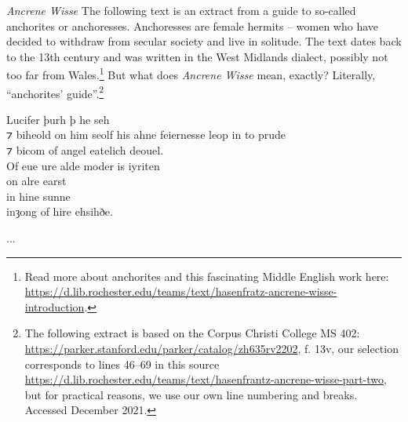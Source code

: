 \begin{texts}{\textit{Ancrene Wisse}}
The following text is an extract from a guide to so-called anchorites or anchoresses. Anchoresses are female hermits -- women who have decided to withdraw from secular society and live in solitude. The text dates back to the 13th century and was written in the West Midlands dialect, possibly not too far from Wales.\footnote{Read more about anchorites and this fascinating Middle English work here: \url{https://d.lib.rochester.edu/teams/text/hasenfratz-ancrene-wisse-introduction}.} But what does \textit{Ancrene Wisse} mean, exactly? Literally, ``anchorites' guide''.\footnote{The following extract is based on the Corpus Christi College MS 402: \url{https://parker.stanford.edu/parker/catalog/zh635rv2202}, f. 13v, our selection corresponds to lines 46--69 in this source \url{https://d.lib.rochester.edu/teams/text/hasenfrantz-ancrene-wisse-part-two}, but for practical reasons, we use our own line numbering and breaks. Accessed December 2021.}

\begin{textglossed}
\internallinenumbers*{}
Lucifer þurh þ he seh\\
⁊ biheold on him seolf his ahne feiernesse leop in to prude\\
⁊ bicom of angel eatelich deouel.\\
Of eue ure alde moder is iyriten\\
on alre earst\\
in hine sunne\\
inȝong of hire ehsihðe.%

...


\end{textglossed}
\end{texts}
